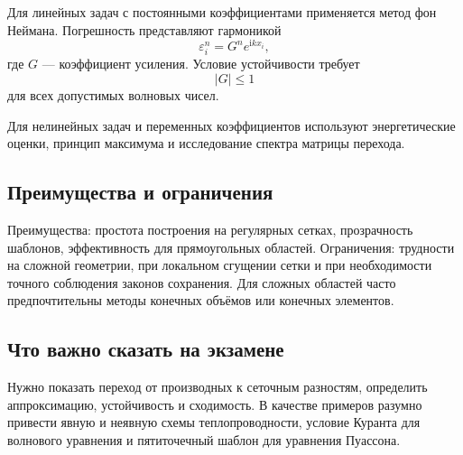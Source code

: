 Для линейных задач с постоянными коэффициентами применяется метод фон Неймана.
Погрешность представляют гармоникой
\[
    \varepsilon_i^n=G^n e^{\mathrm{i}k x_i},
\]
где $G$ --- коэффициент усиления. Условие устойчивости требует
\[
    |G|\leq1
\]
для всех допустимых волновых чисел.

Для нелинейных задач и переменных коэффициентов используют энергетические оценки,
принцип максимума и исследование спектра матрицы перехода.

\subsection{Преимущества и ограничения}

Преимущества: простота построения на регулярных сетках, прозрачность шаблонов,
эффективность для прямоугольных областей. Ограничения: трудности на сложной
геометрии, при локальном сгущении сетки и при необходимости точного соблюдения
законов сохранения. Для сложных областей часто предпочтительны методы конечных
объёмов или конечных элементов.

\subsection{Что важно сказать на экзамене}

Нужно показать переход от производных к сеточным разностям, определить
аппроксимацию, устойчивость и сходимость. В качестве примеров разумно привести
явную и неявную схемы теплопроводности, условие Куранта для волнового уравнения и
пятиточечный шаблон для уравнения Пуассона.

\newpage